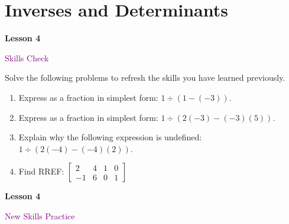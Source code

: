 \documentclass[10pt]{book}
\theoremstyle{definition}
\theoremstyle{remark}
\begin{document}
\section{Inverses and Determinants}
\begin{tcolorbox}[
  width=\textwidth,
  colback=gray!10, %
  colframe=white, %
  boxrule=0pt,    %
  left=1cm,       %
  right=1cm,      %
  sharp corners  %
]

\begin{minipage}[t]{0.5\textwidth}
  \Huge \textbf{Lesson 4}
\end{minipage}%
\hfill
\begin{minipage}[t]{0.5\textwidth}
  \Huge \textcolor{purple}{Skills Check}
\end{minipage}
\end{tcolorbox}

\begin{large}
\noindent
Solve the following problems to refresh the skills you have learned previously.
\begin{enumerate}
\item Express as a fraction in simplest form: $1 \div (1 - (-3))$.\vfil \vfil \vfil
\item Express as a fraction in simplest form: $1 \div (2(-3) - (-3)(5))$.\vfil \vfil \vfil
\item Explain why the following expression is undefined: $1 \div (2(-4) - (-4)(2))$.\vfil \vfil \vfil
\item Find RREF: $\begin{bmatrix} 2 & 4 &1&0\\ -1 & 6&0&1 \end{bmatrix}$\vfil \vfil\vfil
\end{enumerate}
\end{large}
\newpage


\begin{tcolorbox}[
  width=\textwidth,
  colback=gray!10, %
  colframe=white, %
  boxrule=0pt,    %
  left=1cm,       %
  right=1cm,      %
  sharp corners  %
]

\begin{minipage}[t]{0.5\textwidth}
  \Huge \textbf{Lesson 4}
\end{minipage}%
\hfill
\begin{minipage}[t]{0.5\textwidth}
  \Huge\textcolor{purple}{New Skills Practice}
\end{minipage}
\end{tcolorbox}
\end{document}
